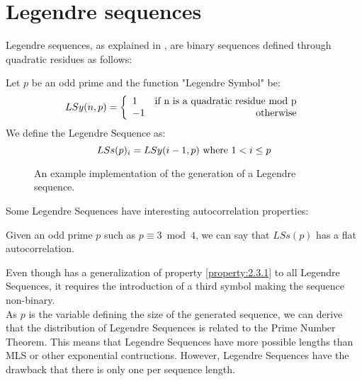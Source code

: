 \section{Legendre sequences}

Legendre sequences, as explained in \citet{legendre_sequences}, are binary
sequences defined through quadratic residues as follows:

\begin{definition}
  Let $p$ be an odd prime and the function "Legendre Symbol" be:
    \begin{equation}
      LSy(n, p) = \left\{\begin{array}{lr}
          1  & \textnormal{if n is a quadratic residue mod p}   \\
          -1 & \textnormal{otherwise} \\
      \end{array}\right.
    \end{equation}
  We define the Legendre Sequence as:
    \begin{equation}
      LSs(p)_{i} = LSy(i-1, p) \textnormal{  where  } 1 < i \leq p
    \end{equation}
\end{definition}

\begin{figure}[ht!]
  \caption{An example implementation of the generation of a Legendre sequence.}
  \label{}
\end{figure}

Some Legendre Sequences have interesting autocorrelation properties:
\begin{property}\label{property:2.3.1}
  Given an odd prime $p$ such as $p \equiv 3 \bmod 4$, we can say that
  $LSs(p)$ has a flat autocorrelation.\cite{legendre_sequences}
\end{property}

Even though \citet{legendre_sequences} has a generalization of property
\ref{property:2.3.1} to all Legendre Sequences, it requires the introduction of
a third symbol making the sequence non-binary. \\

As $p$ is the variable defining the size of the generated sequence, we can
derive that the distribution of Legendre Sequences is related to the Prime
Number Theorem. This means that Legendre Sequences have more possible lengths
than MLS or other exponential contructions. However, Legendre Sequences have
the drawback that there is only one per sequence length.
